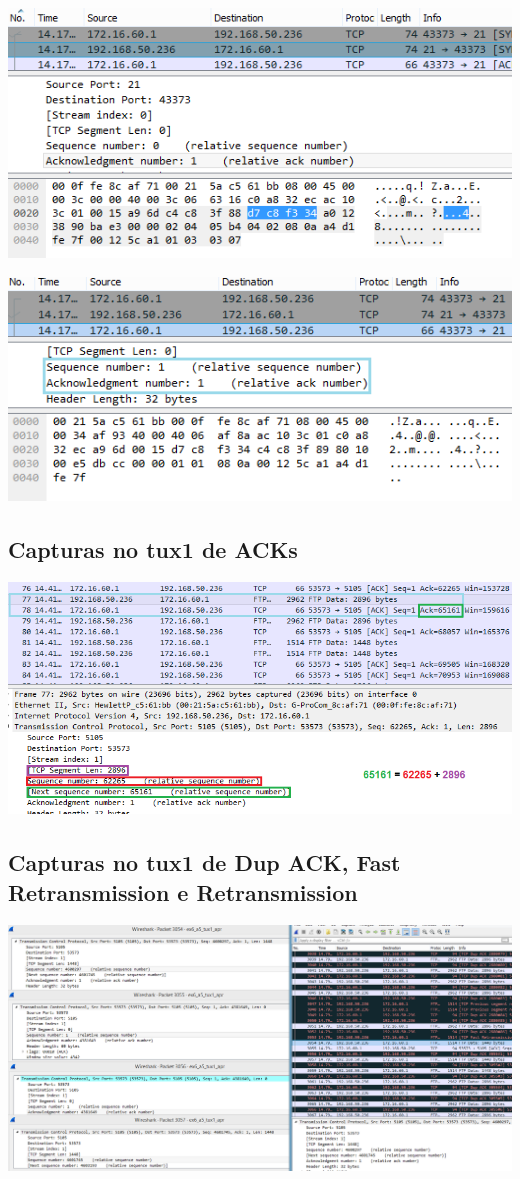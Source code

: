 \documentclass[11pt,a4paper,reqno]{report}
\numberwithin{equation}{section}
\begin{document}
\begin{appendices}
\includegraphics[width=16cm]{ex6_handshake2.png}

\includegraphics[width=16cm]{ex6_handshake3.png}

\subsection{Capturas no tux1 de ACKs}
\label{ex6_acks}
\includegraphics[width=16cm]{ex6_arq.png}

\subsection{Capturas no tux1 de Dup ACK, Fast Retransmission e Retransmission}
\label{ex6_retrans}
\includegraphics[width=16cm]{ex6_tux1_3054.png}


\end{appendices}
\end{document}
